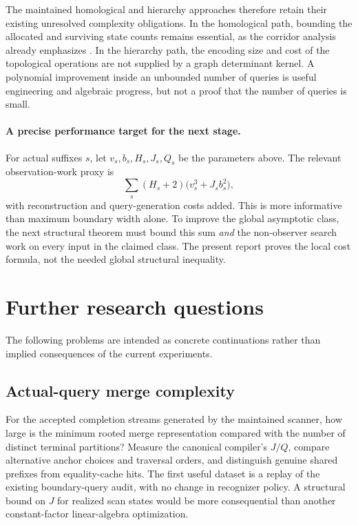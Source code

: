 \documentclass[11pt,letterpaper]{article}
\theoremstyle{definition}\newtheorem{definition}[theorem]{Definition}
\theoremstyle{remark}\newtheorem{remark}[theorem]{Remark}
\begin{document}
The maintained homological and hierarchy approaches therefore retain their existing unresolved complexity obligations. In the homological path, bounding the allocated and surviving state counts remains essential, as the corridor analysis already emphasizes \cite{corridor}. In the hierarchy path, the encoding size and cost of the topological operations are not supplied by a graph determinant kernel. A polynomial improvement inside an unbounded number of queries is useful engineering and algebraic progress, but not a proof that the number of queries is small.

\paragraph{A precise performance target for the next stage.}
For actual suffixes $s$, let $v_s,b_s,H_s,J_s,Q_s$ be the parameters above. The relevant observation-work proxy is
\[
 \sum_s (H_s+2)\bigl(v_s^3+J_sb_s^2\bigr),
\]
with reconstruction and query-generation costs added. This is more informative than maximum boundary width alone. To improve the global asymptotic class, the next structural theorem must bound this sum \emph{and} the non-observer search work on every input in the claimed class. The present report proves the local cost formula, not the needed global structural inequality.

\section{Further research questions}
\label{sec:future}

The following problems are intended as concrete continuations rather than implied consequences of the current experiments.

\subsection{Actual-query merge complexity}
For the accepted completion streams generated by the maintained scanner, how large is the minimum rooted merge representation compared with the number of distinct terminal partitions? Measure the canonical compiler's $J/Q$, compare alternative anchor choices and traversal orders, and distinguish genuine shared prefixes from equality-cache hits. The first useful dataset is a replay of the existing boundary-query audit, with no change in recognizer policy. A structural bound on $J$ for realized scan states would be more consequential than another constant-factor linear-algebra optimization.
\end{document}
